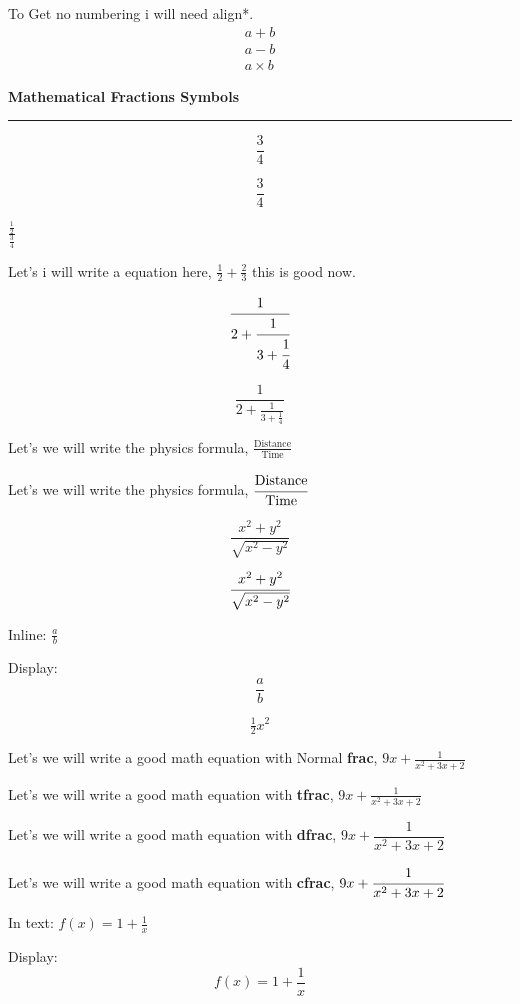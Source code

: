 \documentclass[12pt, letterpaper]{article}
\begin{document}
To Get no numbering i will need align*.
\begin{align*}
    a + b \\
    a - b \\
    a \times b
\end{align*}








\newpage

\begin{center}
    \Huge\textbf{Mathematical Fractions Symbols}
\end{center}

\noindent\rule{\linewidth}{5pt}

\[
\frac{3}{4}
\]

$$
\frac{3}{4}
$$

$\frac{\frac{1}{2}}{\frac{3}{4}}$

Let's i will write a equation here, $\tfrac{1}{2} + \tfrac{2}{3}$ this is good now.


\[
\cfrac{1}{2 + \cfrac{1}{3 + \cfrac{1}{4}}}
\]


\[
\frac{1}{2 + \frac{1}{3 + \frac{1}{4}}}
\]

Let's we will write the physics formula, $\frac{\text{Distance}}{\text{Time}}$

Let's we will write the physics formula, $\cfrac{\text{Distance}}{\text{Time}}$

\[
\frac{x^2 + y^2}{\sqrt{x^2 - y^2}}
\]

\[
\cfrac{x^2 + y^2}{\sqrt{x^2 - y^2}}
\]


\newpage

Inline: $\frac{a}{b}$

Display:
\[
\frac{a}{b}
\]


\[
\tfrac{1}{2}x^2
\]

Let's we will write a good math equation with Normal \textbf{frac}, $9x + \frac{1}{x^2+3x + 2}$

Let's we will write a good math equation with \textbf{tfrac}, $9x + \tfrac{1}{x^2+3x + 2}$

Let's we will write a good math equation with \textbf{dfrac}, $9x + \dfrac{1}{x^2+3x + 2}$

Let's we will write a good math equation with \textbf{cfrac}, $9x + \cfrac{1}{x^2+3x + 2}$




In text: \( f(x) = 1 + \tfrac{1}{x} \)

Display:
\[
f(x) = 1 + \dfrac{1}{x}
\]
\end{document}
